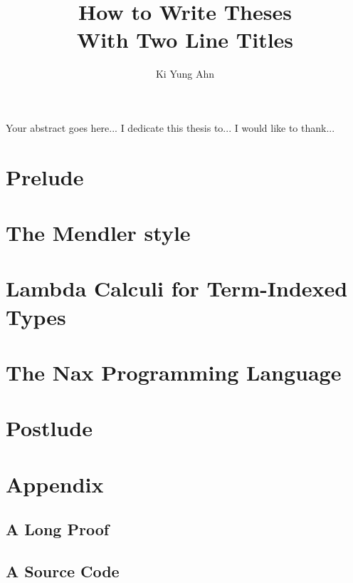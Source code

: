 \documentclass[12pt]{report}
\theoremstyle{definition}
\theoremstyle{remark}
\numberwithin{definition}{section}
\numberwithin{equation}{section}
\numberwithin{proposition}{section}
\numberwithin{conjecture}{section}
\numberwithin{theorem}{section}
\numberwithin{lemma}{section}
\numberwithin{corollary}{section}
\numberwithin{example}{section}
\numberwithin{remark}{section}
\begin{document}
\title{How to Write Theses \\ With Two Line Titles}

\author{Ki Yung Ahn}

\titlep
\prefatory
{}
    Your abstract goes here...
    I dedicate this thesis to...
    I would like to thank...

\afterpreface
\body

\part{Prelude}\label{part:Prelude}

\part{The Mendler style}\label{part:Mendler}

\part{Lambda Calculi for Term-Indexed Types}\label{part:Calculi}

\part{The Nax Programming Language}\label{part:Nax}

\part{Postlude}\label{part:Postlude}




\appendix
\part{Appendix}
\chapter{A Long Proof}
\chapter{A Source Code}
\end{document}
